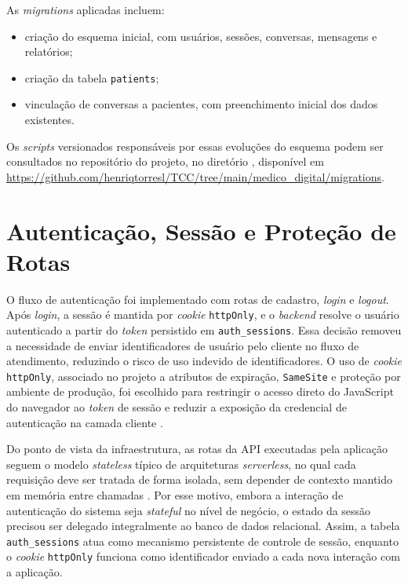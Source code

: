 As \textit{migrations} aplicadas incluem:

\begin{itemize}
\item criação do esquema inicial, com usuários, sessões, conversas, mensagens e relatórios;
\item criação da tabela \texttt{patients};
\item vinculação de conversas a pacientes, com preenchimento inicial dos dados existentes.
\end{itemize}

Os \textit{scripts} versionados responsáveis por essas evoluções do esquema podem ser consultados no
repositório do projeto, no diretório , disponível em
\url{https://github.com/henriqtorresl/TCC/tree/main/medico_digital/migrations}.

\section{Autenticação, Sessão e Proteção de Rotas}

O fluxo de autenticação foi implementado com rotas de cadastro, \textit{login} e \textit{logout}. Após \textit{login}, a
sessão é mantida por \textit{cookie} \texttt{httpOnly}, e o \textit{backend} resolve o usuário autenticado a
partir do \textit{token} persistido em \texttt{auth\_sessions}. Essa decisão removeu a necessidade de
enviar identificadores de usuário pelo cliente no fluxo de atendimento, reduzindo o risco de uso
indevido de identificadores. O uso de \textit{cookie} \texttt{httpOnly}, associado no projeto a
atributos de expiração, \texttt{SameSite} e proteção por ambiente de produção, foi escolhido
para restringir o acesso direto do JavaScript do navegador ao \textit{token} de sessão e reduzir a
exposição da credencial de autenticação na camada cliente \cite{mdnsetcookie2026,owasp2026}.

Do ponto de vista da infraestrutura, as rotas da API executadas pela aplicação seguem o modelo
\textit{stateless} típico de arquiteturas \textit{serverless}, no qual cada requisição deve ser
tratada de forma isolada, sem depender de contexto mantido em memória entre chamadas
\cite{redhatstateless2025,nextjsroutehandlers2026,vercelfunctions2026}. Por esse motivo, embora
a interação de autenticação do sistema seja \textit{stateful} no nível de negócio, o estado da
sessão precisou ser delegado integralmente ao banco de dados relacional. Assim, a tabela
\texttt{auth\_sessions} atua como mecanismo persistente de controle de sessão, enquanto o \textit{cookie}
\texttt{httpOnly} funciona como identificador enviado a cada nova interação com a aplicação.

